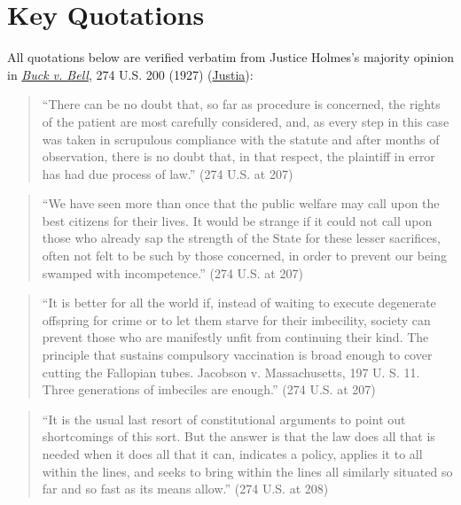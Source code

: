 \documentclass[12pt]{article}
\begin{document}
\section{Key Quotations}

All quotations below are verified verbatim from Justice Holmes's majority opinion in \href{https://www.courtlistener.com/opinion/101076/buck-v-bell/}{\textit{Buck v. Bell}}, 274 U.S. 200 (1927) (\href{https://supreme.justia.com/cases/federal/us/274/200/}{Justia}):

\begin{quote}
``There can be no doubt that, so far as procedure is concerned, the rights of the patient are most carefully considered, and, as every step in this case was taken in scrupulous compliance with the statute and after months of observation, there is no doubt that, in that respect, the plaintiff in error has had due process of law.'' \hfill (274 U.S. at 207)
\end{quote}

\begin{quote}
``We have seen more than once that the public welfare may call upon the best citizens for their lives. It would be strange if it could not call upon those who already sap the strength of the State for these lesser sacrifices, often not felt to be such by those concerned, in order to prevent our being swamped with incompetence.'' \hfill (274 U.S. at 207)
\end{quote}

\begin{quote}
``It is better for all the world if, instead of waiting to execute degenerate offspring for crime or to let them starve for their imbecility, society can prevent those who are manifestly unfit from continuing their kind. The principle that sustains compulsory vaccination is broad enough to cover cutting the Fallopian tubes. Jacobson v. Massachusetts, 197 U. S. 11. Three generations of imbeciles are enough.'' \hfill (274 U.S. at 207)
\end{quote}

\begin{quote}
``It is the usual last resort of constitutional arguments to point out shortcomings of this sort. But the answer is that the law does all that is needed when it does all that it can, indicates a policy, applies it to all within the lines, and seeks to bring within the lines all similarly situated so far and so fast as its means allow.'' \hfill (274 U.S. at 208)
\end{quote}
\end{document}
